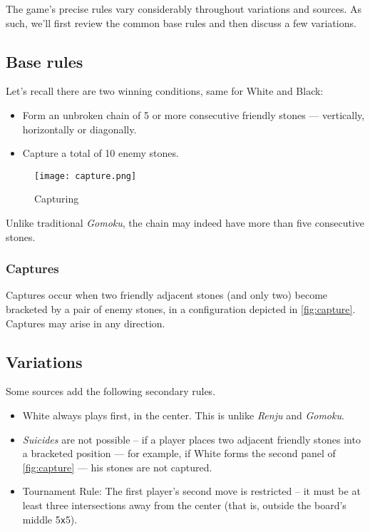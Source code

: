 \documentclass[12pt,a4paper,notitlepage]{article}
\newcommand*{\boardsize}[1]{#1\texttt{x}#1}
\begin{document}
The game's precise rules vary considerably throughout variations and sources. As such, we'll first review the common base rules and then discuss a few variations.

\subsection{Base rules}

Let's recall there are two winning conditions, same for White and Black:

\begin{itemize}
	\large
	\item Form an unbroken chain of 5 or more consecutive friendly stones --- vertically, horizontally or diagonally.
	\item Capture a total of 10 enemy stones.
\end{itemize}

\begin{wrapfigure}[8]{r}[2em]{0.3\textwidth}
	\vspace*{-3\baselineskip}
	\texttt{[image: capture.png]}
	\caption{Capturing\supercite{pente-net} \label{fig:capture}}
\end{wrapfigure}

Unlike traditional \textit{Gomoku}, the chain may indeed have more than five consecutive stones.

\subsubsection{Captures}

Captures occur when two friendly adjacent stones (and only two) become bracketed by a pair of enemy stones, in a configuration depicted in \autoref{fig:capture}. Captures may arise in any direction.

\subsection{Variations}

Some sources add the following secondary rules.

\begin{itemize}
	\item White always plays first, in the center.\supercite{pente-renjunu, pente-wikipedia} This is unlike \textit{Renju} and \textit{Gomoku}.
	\item \textsl{Suicides} are not possible -- if a player places two adjacent friendly stones into a bracketed position --- for example, if White forms the second panel of \autoref{fig:capture} --- his stones are not captured.\supercite{pente-renjunu,pente-org,pente-wikipedia,pente-winning-moves}
	\item Tournament Rule: The first player's second move is restricted -- it must be at least three intersections away from the center (that is, outside the board's middle \boardsize{5}).\supercite{pente-net,pente-org,pente-wikipedia,pente-winning-moves}
\end{itemize}
\end{document}
